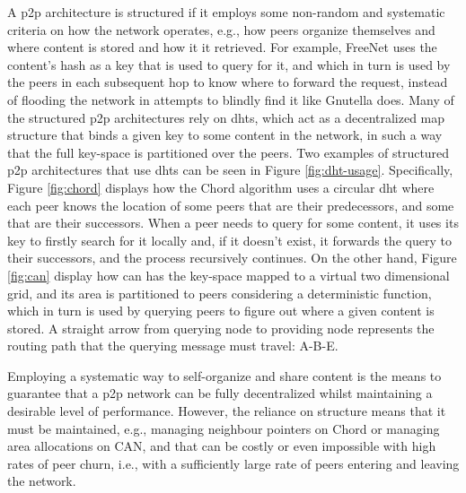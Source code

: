     A \gls{p2p} architecture is structured if it employs some non-random and systematic criteria on how the network operates, e.g., how peers organize themselves and where content is stored and how it it retrieved.
    For example, FreeNet \cite{freenet} uses the content's hash as a key that is used to query for it, and which in turn is used by the peers in each subsequent hop to know where to forward the request, instead of flooding the network in attempts to blindly find it like Gnutella does.
    Many of the structured \gls{p2p} architectures rely on \glspl{dht}, which act as a decentralized map structure that binds a given key to some content in the network, in such a way that the full key-space is partitioned over the peers.
    Two examples of structured \gls{p2p} architectures that use \glspl{dht} can be seen in Figure \ref{fig:dht-usage}. Specifically, Figure \ref{fig:chord} displays how the Chord algorithm uses a circular \gls{dht} where each peer knows the location of some peers that are their predecessors, and some that are their successors.
    When a peer needs to query for some content, it uses its key to firstly search for it locally and, if it doesn't exist, it forwards the query to their successors, and the process recursively continues.
    On the other hand, Figure \ref{fig:can} display how \gls{can} has the key-space mapped to a virtual two dimensional grid, and its area is partitioned to peers considering a deterministic function, which in turn is used by querying peers to figure out where a given content is stored.
    A straight arrow from querying node to providing node represents the routing path that the querying message must travel: A-B-E.

    Employing a systematic way to self-organize and share content is the means to guarantee that a \gls{p2p} network can be fully decentralized whilst maintaining a desirable level of performance.
    However, the reliance on structure means that it must be maintained, e.g., managing neighbour pointers on Chord or managing area allocations on CAN, and that can be costly or even impossible with high rates of peer churn, i.e., with a sufficiently large rate of peers entering and leaving the network.

